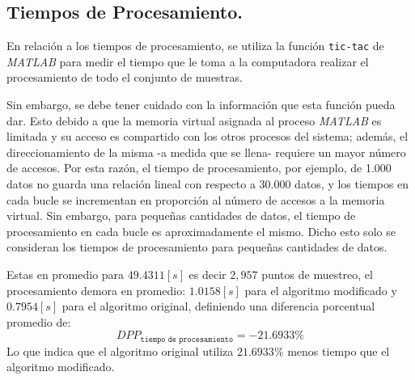 \documentclass[10pt]{report}
\numberwithin{equation}{chapter}
\numberwithin{algorithm}{chapter}
\begin{document}
\subsection{Tiempos de Procesamiento.}
En relación a los tiempos de procesamiento, se utiliza la función \texttt{tic-tac} de \textsl{MATLAB} para medir el tiempo que le toma a la computadora realizar el procesamiento de todo el conjunto de muestras.\par
Sin embargo, se debe tener cuidado con la información que esta función pueda dar. Esto debido a que la memoria virtual asignada al proceso \textsl{MATLAB} es limitada y su acceso es compartido con los otros procesos del sistema; además, el direccionamiento de la misma -a medida que se llena- requiere un mayor número de accesos. Por esta razón, el tiempo de procesamiento, por ejemplo, de 1.000 datos no guarda una relación lineal con respecto a 30.000 datos, y los tiempos en cada bucle se incrementan en proporción al número de accesos a la memoria virtual. Sin embargo, para pequeñas cantidades de datos, el tiempo de procesamiento en cada bucle es aproximadamente el mismo. Dicho esto solo se consideran los tiempos de procesamiento para pequeñas cantidades de datos.\par
Estas en promedio para $49.4311 [s]$ es decir $2,957$ puntos de muestreo, el procesamiento demora en promedio: $1.0158[s]$ para el algoritmo modificado y $0.7954 [s]$ para el algoritmo original, definiendo una diferencia porcentual promedio de:
\begin{equation}
DPP_{\texttt{tiempo de procesamiento}}=-21.6933\%
\end{equation}
Lo que indica que el algoritmo original utiliza $21.6933\%$ menos tiempo que el algoritmo modificado.
\end{document}
